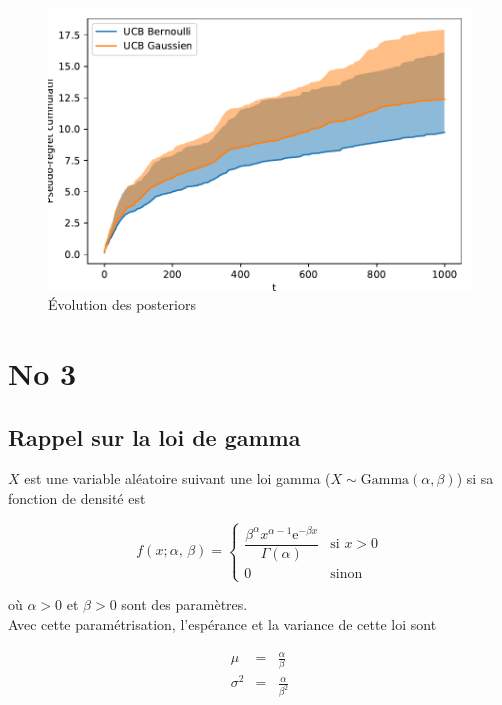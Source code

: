 \documentclass[letterpaper,11pt]{article}
\renewcommand{\exp}[1]{\mathrm{e}^{#1}}
\begin{document}
\begin{figure}[H]
\caption{Évolution des posteriors}
\label{fig: kl_ucb}
\begin{center}

\includegraphics{figures/comparaison.pdf} \hfill
\end{center}
\end{figure}

\section{No 3}

\subsection{Rappel sur la loi de gamma}

$X$ est une variable aléatoire suivant une loi gamma ($X\sim\mathrm{Gamma}(\alpha,\beta)$) si sa fonction de densité est

\begin{equation}
f(x; \alpha,\,\beta) =  
\left\{
\begin{array}{cl}
\dfrac{\beta^{\alpha} x^{\alpha-1} \exp{-\beta x}}{\Gamma(\alpha)} & \text{si } x>0\\[0.4cm]
0 & \text{sinon}
\end{array}
\right.
\end{equation}

où $\alpha>0$ et $\beta>0$ sont des paramètres. \\
Avec cette paramétrisation, l'espérance et la variance de cette loi sont

\begin{eqnarray} 
\mu      &=& \frac{\alpha}{\beta} \label{equation: moyenne gamma}\\
\sigma^2 &=& \frac{\alpha}{\beta^2} \label{equation: variance gamma}
\end{eqnarray}
\end{document}
